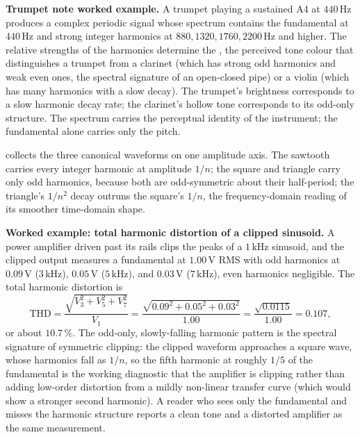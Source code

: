 \textbf{Trumpet note worked example.} A trumpet playing a sustained
A4 at $440 \,\si{\hertz}$ produces a complex periodic signal whose
spectrum contains the fundamental at $440 \,\si{\hertz}$ and
strong integer harmonics at $880, 1320, 1760, 2200 \,\si{\hertz}$
and higher. The relative strengths of the harmonics determine the
, the perceived tone colour that distinguishes a
trumpet from a clarinet (which has strong odd harmonics and weak
even ones, the spectral signature of an open-closed pipe) or a
violin (which has many harmonics with a slow decay). The trumpet's
brightness corresponds to a slow harmonic decay rate; the
clarinet's hollow tone corresponds to its odd-only structure. The
spectrum carries the perceptual identity of the instrument; the
fundamental alone carries only the pitch.

 collects the three canonical
waveforms on one amplitude axis. The sawtooth carries every integer
harmonic at amplitude $1/n$; the square and triangle carry only odd
harmonics, because both are odd-symmetric about their half-period;
the triangle's $1/n^2$ decay outruns the square's $1/n$, the
frequency-domain reading of its smoother time-domain shape.



\textbf{Worked example: total harmonic distortion of a clipped
sinusoid.} A power amplifier driven past its rails clips the peaks
of a $1 \,\si{\kilo\hertz}$ sinusoid, and the clipped output measures
a fundamental at $1.00 \,\text{V}$ RMS with odd harmonics at
$0.09 \,\text{V}$ ($3 \,\si{\kilo\hertz}$), $0.05 \,\text{V}$
($5 \,\si{\kilo\hertz}$), and $0.03 \,\text{V}$ ($7 \,\si{\kilo
\hertz}$), even harmonics negligible. The total harmonic distortion
is
\[
\mathrm{THD} = \frac{\sqrt{V_3^2 + V_5^2 + V_7^2}}{V_1}
= \frac{\sqrt{0.09^2 + 0.05^2 + 0.03^2}}{1.00}
= \frac{\sqrt{0.0115}}{1.00} = 0.107,
\]
or about $10.7\,\%$. The odd-only, slowly-falling harmonic pattern is
the spectral signature of symmetric clipping: the clipped waveform
approaches a square wave, whose harmonics fall as $1/n$, so the fifth
harmonic at roughly $1/5$ of the fundamental is the working diagnostic
that the amplifier is clipping rather than adding low-order distortion
from a mildly non-linear transfer curve (which would show a stronger
second harmonic). A reader who sees only the fundamental and misses
the harmonic structure reports a clean tone and a distorted amplifier
as the same measurement.

